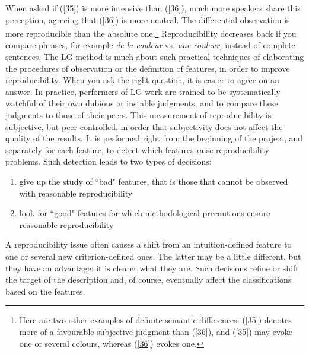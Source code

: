 \documentclass[output=paper]{langsci/langscibook}
\begin{document}
\noindent When asked if (\ref{35}) is more intensive than (\ref{36}), much more speakers share this perception, agreeing that (\ref{36}) is more neutral. The differential observation is more reproducible than the absolute one.\footnote{Here are two other examples of definite semantic differences: (\ref{35}) denotes more of a favourable subjective judgment than (\ref{36}), and (\ref{35}) may evoke one or several colours, whereas (\ref{36}) evokes one.} Reproducibility decreases back if you compare phrases, for example \textit{de la couleur} vs. \textit{une couleur,} instead of complete sentences. The LG method is much about such practical techniques of elaborating the procedures of observation or the definition of features, in order to improve reproducibility. When you ask the right question, it is easier to agree on an answer. In practice, performers of LG work are trained to be systematically watchful of their own dubious or instable judgments, and to compare these judgments to those of their peers. This measurement of reproducibility is subjective, but peer controlled, in order that subjectivity does not affect the quality of the results. It is performed right from the beginning of the project, and separately for each feature, to detect which features raise reproducibility problems. Such detection leads to two types of decisions:

\renewcommand{\theenumi}{(\roman{enumi})}%
\renewcommand\labelenumi{\theenumi}%
\begin{enumerate}
\item give up the study of ``bad" features, that is those that cannot be observed with reasonable reproducibility
\item look for ``good" features for which methodological precautions ensure reasonable reproducibility
\end{enumerate}

\largerpage
\noindent A reproducibility issue often causes a shift from an intuition-defined feature to one or several new criterion-defined ones. The latter may be a little different, but they have an advantage: it is clearer what they are. Such decisions refine or shift the target of the description and, of course, eventually affect the classifications based on the features.
\end{document}
